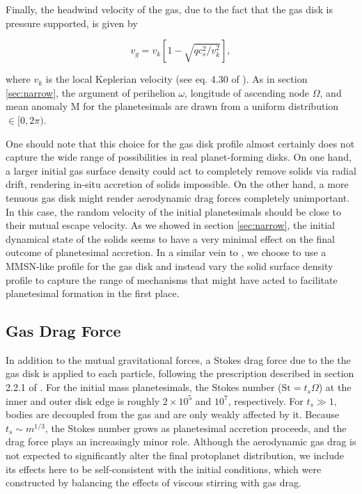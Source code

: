 Finally, the headwind velocity of the gas, due to the fact that the gas disk is pressure supported, is given by

\begin{equation}\label{eq:v_gas}
	v_{g} = v_{k} \left[ 1 - \sqrt{ q c_{s}^2 / v_{k}^2} \right],
\end{equation}

\noindent where $v_{k}$ is the local Keplerian velocity (see eq. 4.30 of \cite{armitage20}). As in section
\ref{sec:narrow}, the argument of perihelion $\omega$, longitude of
ascending node $\Omega$, and mean anomaly M for the planetesimals are drawn from a uniform distribution $\in [0, 2 \pi)$.

One should note that this choice for the gas disk profile almost certainly does not capture the wide range of possibilities in real planet-forming disks. 
On one hand, a larger initial gas surface density could act to completely remove solids via radial drift, rendering in-situ accretion of solids impossible. On the 
other hand, a more tenuous gas disk might render aerodynamic drag forces completely unimportant. In this case, the random velocity of the initial 
planetesimals should be close to their mutual escape velocity. As we showed in section \ref{sec:narrow}, the initial dynamical state of the solids seems to 
have a very minimal effect on the final outcome of planetesimal accretion. In a similar vein to \cite{hansen12}, we choose to use a MMSN-like profile for the 
gas disk and instead vary the solid surface density profile to capture the range of mechanisms that might have acted to facilitate planetesimal formation in the 
first place.

\subsection{Gas Drag Force}

In addition to the mutual gravitational forces, a Stokes drag force
due to the the gas disk is applied to each particle, following the
prescription described in section 2.2.1 of \cite{morishima10}. For
the initial mass planetesimals, the Stokes number
  ($\textrm{St} = t_{s} \Omega$) at the inner and outer disk edge is
  roughly $2 \times 10^{5}$ and $10^{7}$, respectively. For $t_{s} \gg
  1$, bodies are decoupled from the gas and are only weakly affected
  by it. Because $t_{s} \sim m^{1/3}$, the Stokes number grows as planetesimal accretion proceeds, and the drag force plays an increasingly minor role. Although the aerodynamic gas drag is not expected to significantly alter the final protoplanet distribution, we include its effects here to be self-consistent with the initial conditions, which were constructed by balancing the effects of viscous stirring with gas drag.

